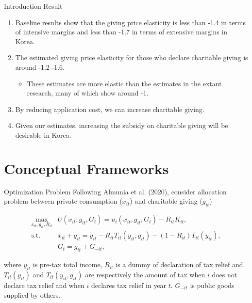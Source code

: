 \documentclass[
  ignorenonframetext,
  aspectratio=169,
]{beamer}
\providecommand{\tightlist}{%
  \setlength{\itemsep}{0pt}\setlength{\parskip}{0pt}}
\begin{document}
\begin{frame}{Introduction}
\protect\hypertarget{introduction-2}{}
Result

\begin{enumerate}
\tightlist
\item
  Baseline results show that the giving price elasticity is less than -1.4 in terms of intensive margins and less than -1.7 in terms of extensive margins in Korea.
\item
  The estimated giving price elasticity for those who declare charitable giving is around -1.2 -1.6.

  \begin{itemize}
  \tightlist
  \item
    These estimates are more elastic than the estimates in the extant research, many of which show around -1.
  \end{itemize}
\item
  By reducing application cost, we can increase charitable giving.
\item
  Given our estimates, increasing the subsidy on charitable giving will be desirable in Korea.
\end{enumerate}
\end{frame}

\hypertarget{conceptual-frameworks}{%
\section{Conceptual Frameworks}\label{conceptual-frameworks}}

\begin{frame}{Optimization Problem}
\protect\hypertarget{optimization-problem}{}
Following Almunia et al. (2020),
consider allocation problem between private consumption (\(x_{it}\)) and charitable giving (\(g_{it}\))

\begin{align}
  \max_{x_{it}, g_{it}, R_{it}} &U(x_{it}, g_{it}, G_t)
  = u_i(x_{it}, g_{it}, G_t) - R_{it}K_{it}, \\
  \text{s.t.}\:\:
  &x_{it} + g_{it}
  = y_{it} - R_{it} T_{it}(y_{it}, g_{it}) - (1 - R_{it}) T_{it}(y_{it}), \\
  &G_t = g_{it} + G_{-it},
\end{align}

where \(y_{it}\) is pre-tax total income, \(R_{it}\) is a dummy of declaration of tax relief and \(T_{it}(y_{it})\) and \(T_{it}(y_{it}, g_{it})\) are respectively the amount of tax when \(i\) does not declare tax relief and when \(i\) declares tax relief in year \(t\). \(G_{-it}\) is public goods supplied by others.
\end{frame}
\end{document}

